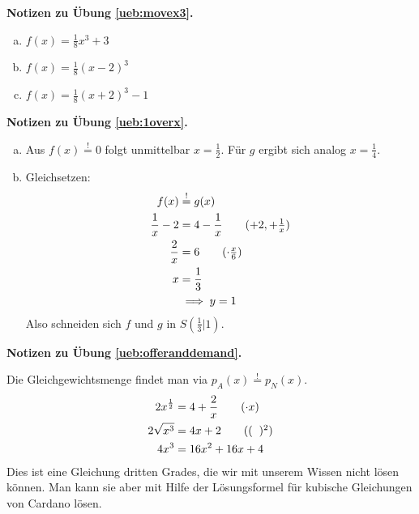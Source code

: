 \documentclass[%
11pt,%
twoside,%
titlepage,%
german,%
headsepline%
]{scrartcl}
\newcommand{\concatueb}[1]{ueb:#1}%
\newcommand{\concatlsg}[1]{lsg:#1}%
\newenvironment{lsg}[1]{%
    \par\noindent\textbf{Notizen zu Übung \ref{\concatueb{#1}}.}%
    \label{\concatlsg{#1}}
}{%
    \par%
}
\begin{document}
\begin{lsg}{movex3}
  \begin{enumerate}[a)]
    \item $f(x)=\frac{1}{8}x^3+3$
    \item $f(x)=\frac{1}{8}(x-2)^3$
    \item $f(x)=\frac{1}{8}(x+2)^3-1$
  \end{enumerate}
\end{lsg}

\begin{lsg}{1overx}
  \begin{enumerate}[a)]
    \item Aus $f(x)\stackrel{!}{=}0$ folgt unmittelbar $x=\frac{1}{2}$. Für $g$ ergibt sich analog $x=\frac{1}{4}$.
    \item Gleichsetzen:
    \begin{align*}
      f(x)&\stackrel{!}{=} g(x)\\
      \frac{1}{x}-2 &= 4-\frac{1}{x}\tag{$+2,+\frac{1}{x}$}\\
      \frac{2}{x} &= 6\tag{$\cdot\frac{x}{6}$}\\
      x &= \frac{1}{3}\\
      &\implies y=1
    \end{align*}
    Also schneiden sich $f$ und $g$ in $S(\frac{1}{3}|1)$.
  \end{enumerate}
\end{lsg}

\begin{lsg}{offeranddemand}
  Die Gleichgewichtsmenge findet man via $p_A(x)\stackrel{!}{=} p_N(x)$.
    \begin{align*}
      2x^\frac{1}{2} &= 4+\frac{2}{x}\tag{$\cdot x$}\\
      2\sqrt{x^3} &= 4x + 2\tag{$(\phantom{x})^2$}\\
      4x^3 &= 16x^2 +16x + 4
    \end{align*}
  Dies ist eine Gleichung dritten Grades, die wir mit unserem Wissen nicht lösen können. Man kann sie aber mit Hilfe der Lösungsformel für kubische Gleichungen von Cardano lösen.
\end{lsg}

\clearpage
\end{document}
